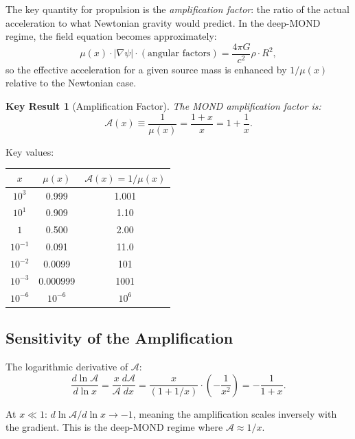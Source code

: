 \documentclass[aps,prd,twocolumn,superscriptaddress,nofootinbib]{revtex4-2}
\newtheorem{result}{Key Result}
\begin{document}
The key quantity for propulsion is the \emph{amplification factor}:
the ratio of the actual acceleration to what Newtonian gravity would
predict.  In the deep-MOND regime, the field equation becomes
approximately:
\begin{equation}
\mu(x) \cdot |\nabla\psi| \cdot (\text{angular factors}) = \frac{4\pi G}{c^2}\rho \cdot R^2,
\end{equation}
so the effective acceleration for a given source mass is enhanced
by $1/\mu(x)$ relative to the Newtonian case.

\begin{result}[Amplification Factor]
The MOND amplification factor is:
\begin{equation}\label{eq:amplification}
\boxed{\mathcal{A}(x) \equiv \frac{1}{\mu(x)} = \frac{1+x}{x} = 1 + \frac{1}{x}}.
\end{equation}
\end{result}

Key values:
\begin{center}
\begin{tabular}{ccc}
\toprule
$x$ & $\mu(x)$ & $\mathcal{A}(x) = 1/\mu(x)$ \\
\midrule
$10^3$ & 0.999 & 1.001 \\
$10^1$ & 0.909 & 1.10 \\
$1$ & 0.500 & 2.00 \\
$10^{-1}$ & 0.091 & 11.0 \\
$10^{-2}$ & 0.0099 & 101 \\
$10^{-3}$ & 0.000999 & 1001 \\
$10^{-6}$ & $10^{-6}$ & $10^6$ \\
\bottomrule
\end{tabular}
\end{center}

\subsection{Sensitivity of the Amplification}

The logarithmic derivative of $\mathcal{A}$:
\begin{equation}
\frac{d\ln\mathcal{A}}{d\ln x} = \frac{x}{\mathcal{A}}\frac{d\mathcal{A}}{dx}
= \frac{x}{(1+1/x)}\cdot\left(-\frac{1}{x^2}\right)
= -\frac{1}{1+x}.
\end{equation}

At $x \ll 1$: $d\ln\mathcal{A}/d\ln x \to -1$, meaning the amplification
scales inversely with the gradient.  This is the deep-MOND regime where
$\mathcal{A} \approx 1/x$.
\end{document}
